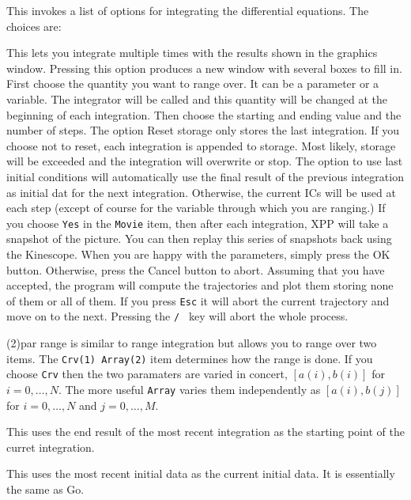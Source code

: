 \documentclass{article}
\newcommand{\tc}[1]{\addcontentsline{toc}{subsection}{#1}}
\begin{document}
\begin{description}

\tc{ICs}\item[(I)nitial conds] This invokes a list of options for integrating the
 differential equations.  The choices are:
\begin{description}
\item[(R)ange]  This lets you integrate multiple times with the results shown
 in the graphics window.  Pressing this option produces a new window with
 several boxes to fill in.  First choose the quantity you want to range
 over.  It can be a parameter or a variable.  The integrator will be called
 and this quantity will be changed at the beginning of each integration.
  Then choose the starting and ending value and the number of steps. The
 option Reset storage only stores the last integration.  If you choose not
 to reset, each integration is appended to storage.  Most likely, storage
 will be exceeded and the integration will overwrite or stop. The option 
to use last initial conditions will automatically use the final result of
 the previous integration as initial dat for the next integration.  Otherwise,
 the current ICs will be used at each step (except of course for the  variable
 through which you are ranging.) 
If you choose {\tt Yes} in the {\tt Movie} item,
then after each integration, XPP will take a snapshot of the picture.
You can then replay this series of snapshots back using the Kinescope.
When you are happy with the parameters, simply
 press the OK button.  Otherwise, press the Cancel button to abort.  Assuming
 that you have accepted, the program will compute the trajectories and plot 
them storing none of them or all of them.  If you press {\tt Esc} it will abort the 
current trajectory and move on to the next.  Pressing the {\tt / } key will abort
 the whole process. 
\item{(2)par range} is similar to range integration but allows you to
range over two items. The {\tt Crv(1) Array(2)} item determines how
the range is done. If you choose {\tt Crv} then the two paramaters are
varied in concert, $[a(i),b(i)]$ for $i=0,\ldots,N$. The more useful
{\tt Array} varies them independently as $[a(i),b(j)]$ for
$i=0,\ldots,N$ and $j=0,\ldots,M.$    
\item[(L)ast]  This uses the end result of the most recent integration as the
 starting point of the curret integration.
\item[(O)ld] This uses the most recent initial data as the current initial 
data.  It is essentially the same as Go.

\end{description}
\end{description}
\end{document}
